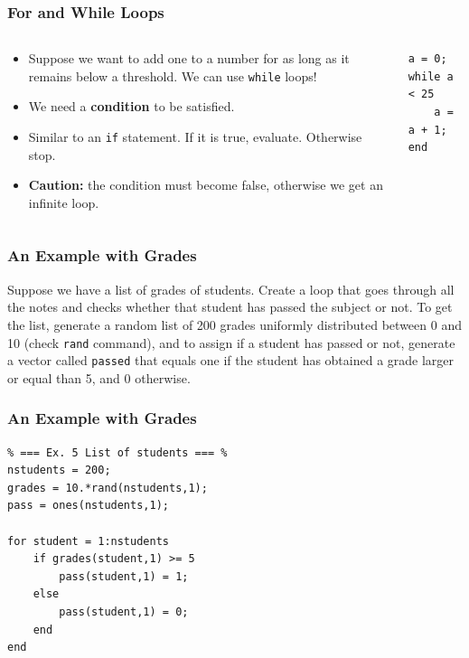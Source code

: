\documentclass[11pt,xcolor={svgnames},aspectratio=169,usepdftitle=false]{beamer}
\begin{document}
\begin{frame}[fragile]
    \frametitle{For and While Loops}
\begin{columns}
    \begin{column}{0.6\textwidth}
        \begin{itemize}
            \item Suppose we want to add one to a number for as long as it remains below a threshold. We can use \verb;while; loops!
            \item We need a \alert{\textbf{condition}} to be satisfied.
            \item Similar to an \verb;if; statement. If it is true, evaluate. Otherwise stop.
            \item \alert{\textbf{Caution:}} the condition must become false, otherwise we get an infinite loop.
        \end{itemize}
    \end{column}
    \begin{column}{0.4\textwidth}
\begin{lstlisting}
a = 0;
while a < 25
    a = a + 1;
end
\end{lstlisting}
    \end{column}
\end{columns}
\end{frame}

\begin{frame}[fragile]
    \frametitle{An Example with Grades}
\begin{exercise}
Suppose we have a list of grades of students. Create a loop that goes through all the notes and checks whether that student has passed the subject or not. To get the list, generate a random list of 200 grades uniformly distributed between 0 and 10 (check \verb;rand; command), and to assign if a student has passed or not, generate a vector called \verb;passed; that equals one if the student has obtained a grade larger or equal than 5, and 0 otherwise.
\end{exercise}
\end{frame}

\begin{frame}[fragile]
    \frametitle{An Example with Grades}
\begin{lstlisting}
% === Ex. 5 List of students === %
nstudents = 200;
grades = 10.*rand(nstudents,1);
pass = ones(nstudents,1);
    
for student = 1:nstudents
    if grades(student,1) >= 5
        pass(student,1) = 1;
    else
        pass(student,1) = 0;
    end
end
\end{lstlisting}
\end{frame}
\end{document}
